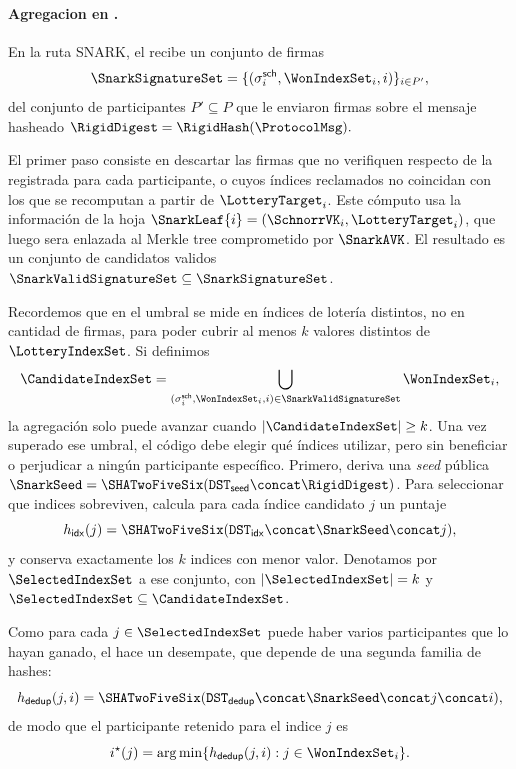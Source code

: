 \paragraph{Agregacion en \Lagrange.}
En la ruta SNARK, el \MithrilAggregator recibe un conjunto de firmas
$$\SnarkSignatureSet = \{(\sigma_i^{\mathsf{sch}}, \WonIndexSet_i, i)\}_{i \in P'},$$
del conjunto de participantes $P' \subseteq P$ que le enviaron firmas sobre el mensaje hasheado $\RigidDigest = \RigidHash(\ProtocolMsg).$

El primer paso consiste en descartar las firmas que no verifiquen respecto de la \SchnorrVK registrada para cada participante, o cuyos índices reclamados no coincidan con los que se recomputan a partir de $\LotteryTarget_i$. Este cómputo usa la información de la hoja $\SnarkLeaf{i} = (\SchnorrVK_i,\LotteryTarget_i)$, que luego sera enlazada al Merkle tree comprometido por \(\SnarkAVK\). El resultado es un conjunto de candidatos validos $\SnarkValidSignatureSet \subseteq \SnarkSignatureSet$.

Recordemos que en \STM el umbral se mide en índices de lotería distintos, no en cantidad de firmas, para poder cubrir al menos $k$ valores distintos de $\LotteryIndexSet$. Si definimos
$$\CandidateIndexSet = \bigcup_{(\sigma_i^{\mathsf{sch}},\WonIndexSet_i,i)\in \SnarkValidSignatureSet} \WonIndexSet_i,$$
la agregación solo puede avanzar cuando \(|\CandidateIndexSet| \ge k\). Una vez superado ese umbral, el código debe elegir qué índices utilizar, pero sin beneficiar o perjudicar a ningún participante específico. Primero, deriva una \textit{seed} pública $\SnarkSeed = \SHATwoFiveSix(\texttt{DST}_{\mathsf{seed}} \concat \RigidDigest)$. Para seleccionar que indices sobreviven, calcula para cada índice candidato $j$ un puntaje
$$h_{\mathsf{idx}}(j) =
\SHATwoFiveSix(\texttt{DST}_{\mathsf{idx}} \concat \SnarkSeed \concat j),$$
y conserva exactamente los $k$ indices con menor valor. Denotamos por $\SelectedIndexSet $ a ese conjunto, con
$|\SelectedIndexSet| = k$ y $\SelectedIndexSet \subseteq \CandidateIndexSet$.

Como para cada $j \in \SelectedIndexSet$ puede haber varios participantes que lo hayan ganado, el \MithrilAggregator hace un desempate, que depende de una segunda familia de hashes:
$$h_{\mathsf{dedup}}(j,i) =
\SHATwoFiveSix(\texttt{DST}_{\mathsf{dedup}} \concat \SnarkSeed \concat j \concat i),$$
de modo que el participante retenido para el indice $j$ es
$$i^{\star}(j) = \arg\min\{h_{\mathsf{dedup}}(j,i) : j \in \WonIndexSet_i\}.$$

